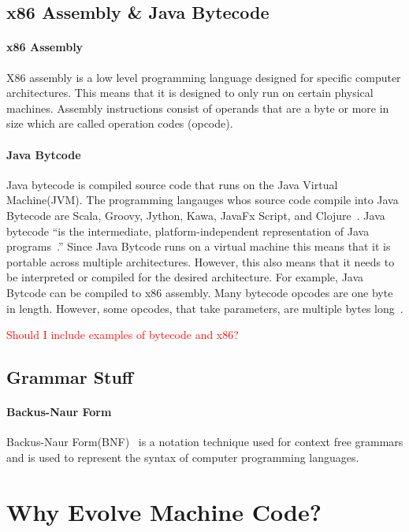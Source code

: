 \documentclass{sig-alternate}
\newcommand{\mycomment}[1]{\textcolor{red}{#1}}
\begin{document}
\subsection{x86 Assembly \& Java Bytecode}
\paragraph{x86 Assembly}
X86 assembly is a low level programming language designed for specific computer architectures. This means that it is designed to only run on certain physical machines. Assembly instructions consist of operands that are a byte or more in size which are called operation codes (opcode).

\paragraph{Java Bytcode}
Java bytecode is compiled source code that runs on the Java Virtual Machine(JVM). The programming langauges whos source code compile into Java Bytecode are Scala, Groovy, Jython, Kawa, JavaFx Script, and Clojure~\cite{FINCH:2011}. Java bytecode ``is the intermediate, platform-independent representation of Java programs~\cite{VIII:2011}.'' Since Java Bytcode runs on a virtual machine this means that it is portable across multiple architectures. However, this also means that it needs to be interpreted or compiled for the desired architecture. For example, Java Bytcode can be compiled to x86 assembly. Many bytecode opcodes are one byte in length. However, some opcodes, that take parameters, are multiple bytes long~\cite{JavaBytecode:2014}.


\mycomment{Should I include examples of bytecode and x86?}


\subsection{Grammar Stuff}

\paragraph{Backus-Naur Form}
	Backus-Naur Form(BNF)~\cite{BNF:2014} is a notation technique used for context free grammars and is used to represent the syntax of computer programming languages.




\section{Why Evolve Machine Code?}
\end{document}
